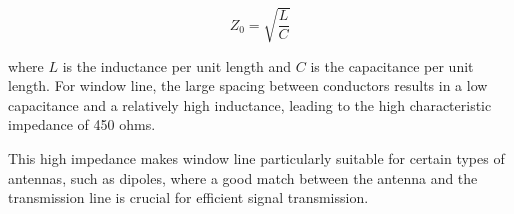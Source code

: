 \[
Z_0 = \sqrt{\frac{L}{C}}
\]

where \( L \) is the inductance per unit length and \( C \) is the capacitance per unit length. For window line, the large spacing between conductors results in a low capacitance and a relatively high inductance, leading to the high characteristic impedance of 450 ohms.

This high impedance makes window line particularly suitable for certain types of antennas, such as dipoles, where a good match between the antenna and the transmission line is crucial for efficient signal transmission.

